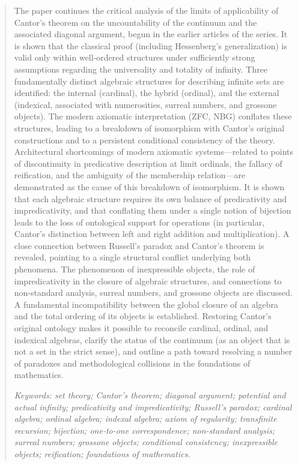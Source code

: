 \documentclass[12pt]{article}
\begin{document}

\begin{abstract}

The paper continues the critical analysis of the limits of applicability of Cantor's theorem on the uncountability of the continuum and the associated diagonal argument, begun in the earlier articles of the series. It is shown that the classical proof (including Hessenberg's generalization) is valid only within well-ordered structures under sufficiently strong assumptions regarding the universality and totality of infinity. Three fundamentally distinct algebraic structures for describing infinite sets are identified: the internal (cardinal), the hybrid (ordinal), and the external (indexical, associated with numerosities, surreal numbers, and grossone objects). The modern axiomatic interpretation (ZFC, NBG) conflates these structures, leading to a breakdown of isomorphism with Cantor's original constructions and to a persistent conditional consistency of the theory. Architectural shortcomings of modern axiomatic systems—related to points of discontinuity in predicative description at limit ordinals, the fallacy of reification, and the ambiguity of the membership relation—are demonstrated as the cause of this breakdown of isomorphism. It is shown that each algebraic structure requires its own balance of predicativity and impredicativity, and that conflating them under a single notion of bijection leads to the loss of ontological support for operations (in particular, Cantor's distinction between left and right addition and multiplication). A close connection between Russell's paradox and Cantor's theorem is revealed, pointing to a single structural conflict underlying both phenomena. The phenomenon of inexpressible objects, the role of impredicativity in the closure of algebraic structures, and connections to non-standard analysis, surreal numbers, and grossone objects are discussed. A fundamental incompatibility between the global closure of an algebra and the total ordering of its objects is established. Restoring Cantor's original ontology makes it possible to reconcile cardinal, ordinal, and indexical algebras, clarify the status of the continuum (as an object that is not a set in the strict sense), and outline a path toward resolving a number of paradoxes and methodological collisions in the foundations of mathematics.

{\it Keywords: set theory; Cantor's theorem; diagonal argument; potential and actual infinity; predicativity and impredicativity; Russell's paradox; cardinal algebra; ordinal algebra; indexal algebra; axiom of regularity; transfinite recursion; bijection; one-to-one correspondence; non-standard analysis; surreal numbers; grossone objects; conditional consistency; inexpressible objects; reification; foundations of mathematics.}

\end{abstract}
\end{document}
